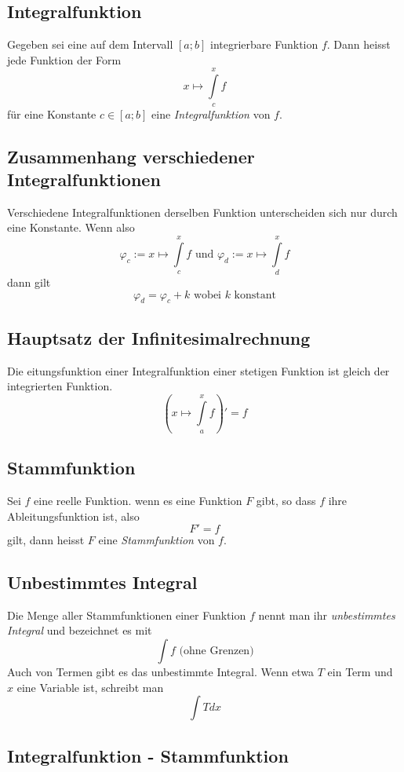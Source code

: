 \documentclass[10pt,a4paper]{scrartcl}
\begin{document}
\subsection{Integralfunktion}

Gegeben sei eine auf dem Intervall $[a;b]$ integrierbare Funktion $f$. Dann heisst
jede Funktion der Form
$$x \mapsto \int\limits_c^x f$$
für eine Konstante $c \in [a;b]$ eine \textit{Integralfunktion} von $f$.


\subsection{Zusammenhang verschiedener Integralfunktionen}

Verschiedene Integralfunktionen derselben Funktion unterscheiden sich nur durch
eine Konstante. Wenn also
$$\varphi_c := x \mapsto \int\limits_c^x f \textrm{ und } \varphi_d := x \mapsto
    \int\limits_d^x f$$
dann gilt
$$\varphi_d = \varphi_c + k \textrm{ wobei } k \textrm{ konstant}$$


\subsection{Hauptsatz der Infinitesimalrechnung}

Die eitungsfunktion einer Integralfunktion einer stetigen Funktion ist
gleich der integrierten Funktion.
$$\left(x \mapsto \int\limits_a^x f\right)' = f$$


\subsection{Stammfunktion}

Sei $f$ eine reelle Funktion. wenn es eine Funktion $F$ gibt, so dass $f$
ihre Ableitungsfunktion ist, also
$$F' = f$$
gilt, dann heisst $F$ eine \textit{Stammfunktion} von $f$.


\subsection{Unbestimmtes Integral}

Die Menge aller Stammfunktionen einer Funktion $f$ nennt man ihr \textit{unbestimmtes Integral} und bezeichnet es mit
$$\int f \textrm{ (ohne Grenzen)}$$
Auch von Termen gibt es das unbestimmte Integral. Wenn etwa $T$ ein Term und $x$ eine Variable ist, schreibt man
$$\int Tdx$$


\subsection{Integralfunktion - Stammfunktion}
\end{document}
